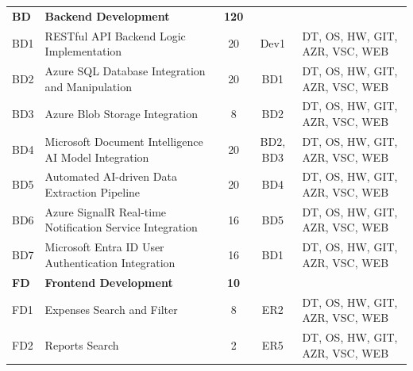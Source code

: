 \begin{longtable}{l p{6.5cm} c c p{5cm}}
    \rowcolor{gray!20}
    \textbf{BD} & \textbf{Backend Development} & \textbf{120} & & \\
    \rowcolor{gray!05}
    BD1 & RESTful API Backend Logic Implementation & 20 & Dev1 & DT, OS, HW, GIT, AZR, VSC, WEB \\ 
    \rowcolor{gray!05}
    BD2 & Azure SQL Database Integration and Manipulation & 20 & BD1 & DT, OS, HW, GIT, AZR, VSC, WEB \\ 
    \rowcolor{gray!05}
    BD3 & Azure Blob Storage Integration & 8 & BD2 & DT, OS, HW, GIT, AZR, VSC, WEB \\ 
    \rowcolor{gray!05}
    BD4 & Microsoft Document Intelligence AI Model Integration & 20 & BD2, BD3 & DT, OS, HW, GIT, AZR, VSC, WEB \\
    \rowcolor{gray!05}
    BD5 & Automated AI-driven Data Extraction Pipeline & 20 & BD4 & DT, OS, HW, GIT, AZR, VSC, WEB \\ 
    \rowcolor{gray!05}
    BD6 & Azure SignalR Real-time Notification Service Integration & 16 & BD5 & DT, OS, HW, GIT, AZR, VSC, WEB \\ 
    \rowcolor{gray!05}
    BD7 & Microsoft Entra ID User Authentication Integration & 16 & BD1 & DT, OS, HW, GIT, AZR, VSC, WEB \\ 

    \rowcolor{gray!20}
    \textbf{FD} & \textbf{Frontend Development} & \textbf{10} & & \\ 
    \rowcolor{gray!05}
    FD1 & Expenses Search and Filter & 8 & ER2 & DT, OS, HW, GIT, AZR, VSC, WEB \\ 
    \rowcolor{gray!05}
    FD2 & Reports Search & 2 & ER5 & DT, OS, HW, GIT, AZR, VSC, WEB \\ 

    \end{longtable}
    \normalsize


    